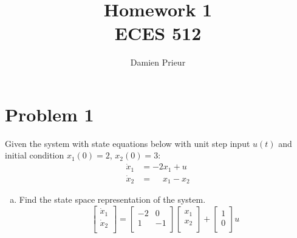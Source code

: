 \documentclass{article}
\author{Damien Prieur}
\title{Homework 1 \\ ECES 512}
\date{}
\begin{document}
\maketitle

\section*{Problem 1}
Given the system with state equations below with unit step input $u(t)$ and initial condition $x_1(0) = 2$, $x_2(0)=3$:
\begin{align*}
\dot{x}_1 &= -2x_1 + u \\
\dot{x}_2 &= \phantom{-}x_1 - x_2
\end{align*}

\begin{enumerate}[a.]
\item Find the state space representation of the system.
$$
\begin{bmatrix}
\dot{x}_1 \\
\dot{x}_2 \\
\end{bmatrix}
=
\begin{bmatrix}
-2 & 0 \\
1  & -1 \\
\end{bmatrix}
\begin{bmatrix}
x_1 \\
x_2 \\
\end{bmatrix}
+
\begin{bmatrix}
1 \\
0 \\
\end{bmatrix}
u
$$


\end{enumerate}
\end{document}
